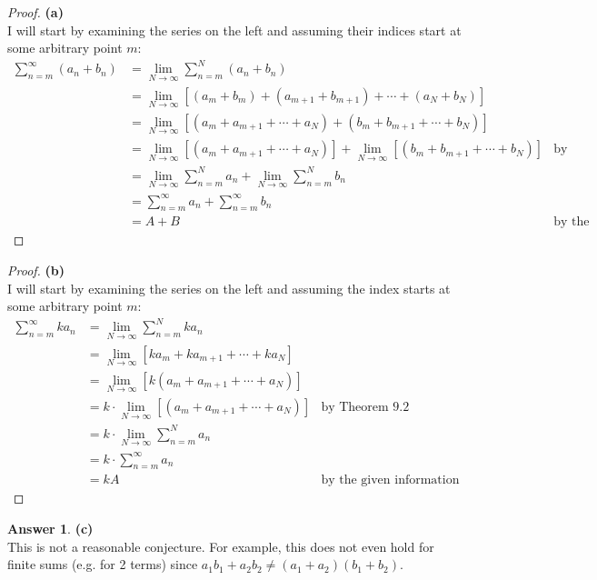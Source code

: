 \documentclass[10pt,a4paper]{article}
\theoremstyle{definition}
\newtheorem*{answer*}{Answer}
\begin{document}
\begin{proof}{\textbf{(a)}}
\\I will start by examining the series on the left and assuming their indices start at some arbitrary point $m$:
\begin{align*}
\sum_{n = m}^{\infty} (a_n + b_n) &= \lim_{N \to \infty} \sum_{n = m}^{N}(a_n + b_n)\\
&= \lim_{N \to \infty}\left[(a_m + b_m) + (a_{m+1} + b_{m+1}) + \cdots + (a_N + b_N)\right]\\
&= \lim_{N \to \infty} \left[(a_m + a_{m+1} + \cdots + a_N) + (b_m + b_{m+1} + \cdots + b_N)\right]\\
&= \lim_{N \to \infty}\left[(a_m + a_{m+1} + \cdots + a_N)\right] + \lim_{N \to \infty}\left[(b_m + b_{m+1} + \cdots + b_N)\right] &\text{by Theorem 9.3}\\
&= \lim_{N \to \infty} \sum_{n = m}^{N} a_n + \lim_{N \to \infty} \sum_{n = m}^{N} b_n\\
&= \sum_{n = m}^{\infty} a_n + \sum_{n = m}^{\infty} b_n\\
&= A + B &\text{by the given information}
\end{align*}
\end{proof}

\begin{proof}{\textbf{(b)}}
\\I will start by examining the series on the left and assuming the index starts at some arbitrary point $m$:
\begin{align*}
\sum_{n = m}^{\infty} ka_n &= \lim_{N \to \infty} \sum_{n = m}^{N}ka_n\\
&= \lim_{N \to \infty}\left[ka_m + ka_{m + 1} + \cdots + ka_N \right]\\
&= \lim_{N \to \infty} \left[k(a_m + a_{m+1} + \cdots + a_N)\right]\\
&= k \cdot \lim_{N \to \infty}\left[(a_m + a_{m+1} + \cdots + a_N)\right] &\text{by Theorem 9.2}\\
&= k \cdot \lim_{N \to \infty} \sum_{n = m}^{N} a_n\\
&= k \cdot \sum_{n = m}^{\infty} a_n\\
&= kA &\text{by the given information}
\end{align*}
\end{proof}

\begin{answer*}{\textbf{(c)}}
\\This is not a reasonable conjecture. For example, this does not even hold for finite sums (e.g. for 2 terms) since $a_1b_1 + a_2b_2 \neq (a_1 + a_2)(b_1 + b_2)$.
\end{answer*}
\end{document}
